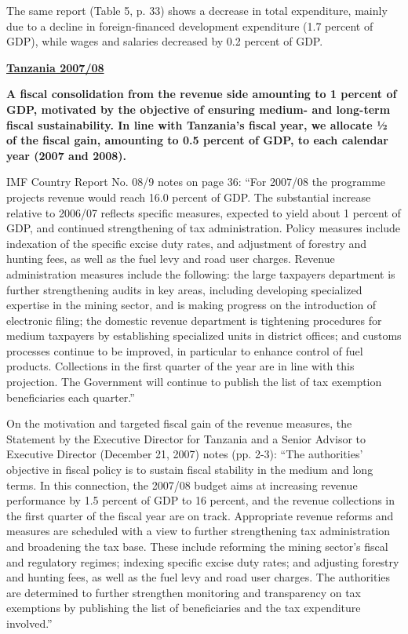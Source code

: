 The same report (Table 5, p. 33) shows a decrease in total expenditure, mainly due to a decline in foreign-financed development expenditure (1.7 percent of GDP), while wages and salaries decreased by 0.2 percent of GDP.

\textbf{\underline{Tanzania 2007/08}}

\textbf{A fiscal consolidation from the revenue side amounting to 1 percent of GDP, motivated by the objective of ensuring medium- and long-term fiscal sustainability. In line with Tanzania’s fiscal year, we allocate ½ of the fiscal gain, amounting to 0.5 percent of GDP, to each calendar year (2007 and 2008).}

IMF Country Report No. 08/9 notes on page 36: “For 2007/08 the programme projects revenue would reach 16.0 percent of GDP. The substantial increase relative to 2006/07 reflects specific measures, expected to yield about 1 percent of GDP,  and continued strengthening of tax administration. Policy measures include indexation of the specific excise duty rates, and adjustment of forestry and hunting fees, as well as the fuel levy and road user charges. Revenue administration measures include the following: the large taxpayers department is further strengthening audits in key areas, including developing specialized expertise in the mining sector, and is making progress on the introduction of electronic filing; the domestic revenue department is tightening procedures for medium taxpayers by establishing specialized units in district offices; and customs processes continue to be improved, in particular to enhance control of fuel products. Collections in the first quarter of the year are in line with this projection. The Government will continue to publish the list of tax exemption beneficiaries each quarter.”

On the motivation and targeted fiscal gain of the revenue measures, the Statement by the Executive Director for Tanzania and a Senior Advisor to Executive Director (December 21, 2007)  notes (pp. 2-3): “The authorities' objective in fiscal policy is to sustain fiscal stability in the medium and long terms. In this connection, the 2007/08 budget aims at increasing revenue performance by 1.5 percent of GDP to 16 percent, and the revenue collections in the first quarter of the fiscal year are on track. Appropriate revenue reforms and measures are scheduled with a view to further strengthening tax administration and broadening the tax base. These include reforming the mining sector's fiscal and regulatory regimes; indexing specific excise duty rates; and adjusting forestry and hunting fees, as well as the fuel levy and road user charges. The authorities are determined to further strengthen monitoring and transparency on tax exemptions by publishing the list of beneficiaries and the tax expenditure involved.”

